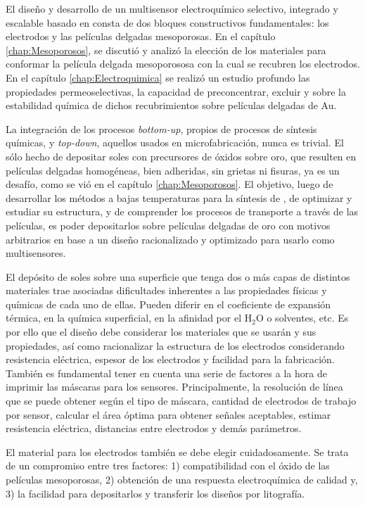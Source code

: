 	El diseño y desarrollo de un multisensor electroquímico selectivo, integrado y escalable basado en \pdm\space consta de dos bloques constructivos fundamentales: los electrodos y las películas delgadas mesoporosas. En el capítulo \ref{chap:Mesoporosos}, se discutió y analizó la elección de los materiales para conformar la película delgada mesoporososa con la cual se recubren los electrodos. En el capítulo \ref{chap:Electroquimica} se realizó un estudio profundo las propiedades permeoselectivas, la capacidad de preconcentrar, excluir y sobre la estabilidad química de dichos recubrimientos sobre películas delgadas de Au.

	La integración de los procesos \textit{bottom-up}, propios de procesos de síntesis químicas, y \textit{top-down}, aquellos usados en microfabricación, nunca es trivial. El sólo hecho de depositar soles con precursores de óxidos sobre oro, que resulten en películas delgadas homogéneas, bien adheridas, sin grietas ni fisuras, ya es un desafío, como se vió en el capítulo \ref{chap:Mesoporosos}. El objetivo, luego de desarrollar los métodos a bajas temperaturas para la síntesis de \pdm, de optimizar y estudiar su estructura, y de comprender los procesos de transporte a través de las películas, es poder depositarlos sobre películas delgadas de oro con motivos arbitrarios en base a un diseño racionalizado y optimizado para usarlo como multisensores. 

	El depósito de soles sobre una superficie que tenga dos o más capas de distintos  materiales trae asociadas dificultades inherentes a las propiedades físicas y químicas de cada uno de ellas. Pueden diferir en el coeficiente de expansión térmica, en la química superficial, en la afinidad por el H$_2$O o solventes, etc.
	Es por ello que el diseño debe considerar los materiales que se usarán y sus propiedades, así como racionalizar la estructura de los electrodos considerando resistencia eléctrica, espesor de los electrodos y facilidad para la fabricación. También es fundamental tener en cuenta una serie de factores a la hora de imprimir las máscaras para los sensores. Principalmente, la resolución de línea que se puede obtener según el tipo de máscara, cantidad de electrodos de trabajo por sensor, calcular el área óptima para obtener señales aceptables, estimar resistencia eléctrica, distancias entre electrodos y demás parámetros.

	El material para los electrodos también se debe elegir cuidadosamente. Se trata de un compromiso entre tres factores: 1) compatibilidad con el óxido de las películas mesoporosas, 2) obtención de una respuesta electroquímica de calidad y, 3) la facilidad para depositarlos y transferir los diseños por litografía.

